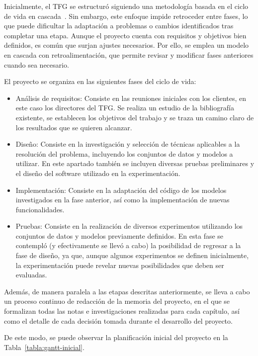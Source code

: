 Inicialmente, el TFG se estructuró siguiendo una metodología basada en el ciclo de vida en cascada~\cite{Pressman1994}. Sin embargo, este enfoque impide retroceder entre fases, lo que puede dificultar la adaptación a problemas o cambios identificados tras completar una etapa. Aunque el proyecto cuenta con requisitos y objetivos bien definidos, es común que surjan ajustes necesarios. Por ello, se emplea un modelo en cascada con retroalimentación, que permite revisar y modificar fases anteriores cuando sea necesario.\newline

El proyecto se organiza en las siguientes fases del ciclo de vida:

\begin{itemize}
    \item Análisis de requisitos: Consiste en las reuniones iniciales con los clientes, en este caso los directores del TFG. Se realiza un estudio de la bibliografía existente, se establecen los objetivos del trabajo y se traza un camino claro de los resultados que se quieren alcanzar.
    \item Diseño: Consiste en la investigación y selección de técnicas aplicables a la resolución del problema, incluyendo los conjuntos de datos y modelos a utilizar. En este apartado también se incluyen diversas pruebas preliminares y el diseño del software utilizado en la experimentación.
    \item Implementación: Consiste en la adaptación del código de los modelos investigados en la fase anterior, así como la implementación de nuevas funcionalidades.
    \item Pruebas: Consiste en la realización de diversos experimentos utilizando los conjuntos de datos y modelos previamente definidos. En esta fase se contempló (y efectivamente se llevó a cabo) la posibilidad de regresar a la fase de diseño, ya que, aunque algunos experimentos se definen inicialmente, la experimentación puede revelar nuevas posibilidades que deben ser evaluadas.
\end{itemize}

Además, de manera paralela a las etapas descritas anteriormente, se lleva a cabo un proceso continuo de redacción de la memoria del proyecto, en el que se formalizan todas las notas e investigaciones realizadas para cada capítulo, así como el detalle de cada decisión tomada durante el desarrollo del proyecto.\newline

De este modo, se puede observar la planificación inicial del proyecto en la Tabla~\ref{tabla:gantt-inicial}.\newline

